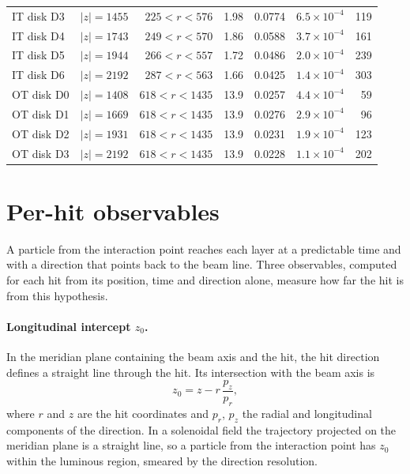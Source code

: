 \IfFileExists{jinst.cls}{\documentclass[a4paper,11pt]{jinst}}
\begin{document}
\begin{table}[htbp]
\begin{tabular}{lrrrrrr}
    IT disk D3 & $|z|=1455$ & $225<r<576$ & 1.98 & 0.0774 & $6.5\times10^{-4}$ & 119 \\
    IT disk D4 & $|z|=1743$ & $249<r<570$ & 1.86 & 0.0588 & $3.7\times10^{-4}$ & 161 \\
    IT disk D5 & $|z|=1944$ & $266<r<557$ & 1.72 & 0.0486 & $2.0\times10^{-4}$ & 239 \\
    IT disk D6 & $|z|=2192$ & $287<r<563$ & 1.66 & 0.0425 & $1.4\times10^{-4}$ & 303 \\
    OT disk D0 & $|z|=1408$ & $618<r<1435$ & 13.9 & 0.0257 & $4.4\times10^{-4}$ & 59 \\
    OT disk D1 & $|z|=1669$ & $618<r<1435$ & 13.9 & 0.0276 & $2.9\times10^{-4}$ & 96 \\
    OT disk D2 & $|z|=1931$ & $618<r<1435$ & 13.9 & 0.0231 & $1.9\times10^{-4}$ & 123 \\
    OT disk D3 & $|z|=2192$ & $618<r<1435$ & 13.9 & 0.0228 & $1.1\times10^{-4}$ & 202 \\
    \bottomrule
  \end{tabular}
\end{table}

\section{Per-hit observables}\label{sec:obs}

A particle from the interaction point reaches each layer at a predictable time and with a direction
that points back to the beam line. Three observables, computed for each hit from its position, time
and direction alone, measure how far the hit is from this hypothesis.

\paragraph{Longitudinal intercept $z_0$.} In the meridian plane containing the beam axis and the
hit, the hit direction defines a straight line through the hit. Its intersection with the beam axis
is
\begin{equation}
  z_0 = z - r\,\frac{p_z}{p_r},
\end{equation}
where $r$ and $z$ are the hit coordinates and $p_r$, $p_z$ the radial and longitudinal components of
the direction. In a solenoidal field the trajectory projected on the meridian plane is a straight
line, so a particle from the interaction point has $z_0$ within the luminous region, smeared by the
direction resolution.
\end{document}
